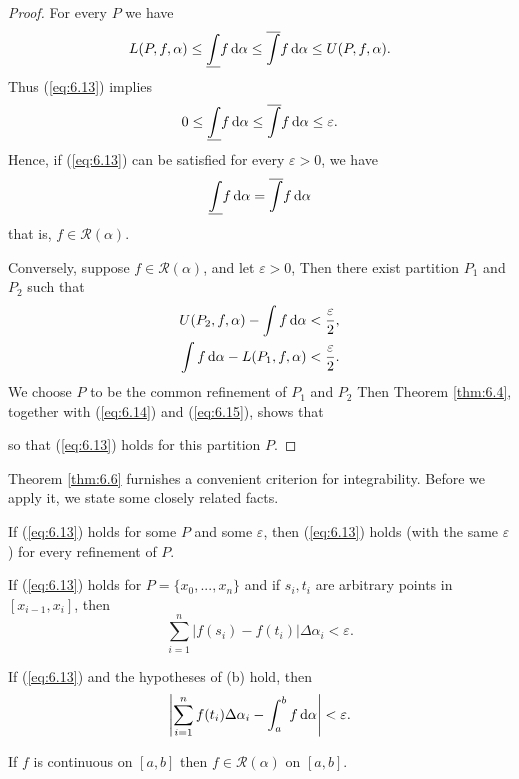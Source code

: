 \begin{proof}
    For every $P$ we have 
    \begin{equation*}
        L(P, f, \alpha)  \leq
        \underline{\int} f \d \alpha \leq
        \overline{\int}  f \d \alpha \leq
        U(P, f, \alpha) .
    \end{equation*}
    Thus (\ref{eq:6.13}) implies 
    \begin{equation*}
        0 \leq
        \underline{\int} f \d \alpha \leq
        \overline{\int}  f \d \alpha \leq
        \varepsilon .
    \end{equation*}
    Hence, if (\ref{eq:6.13}) can be satisfied for every $\varepsilon >0$,
    we have 
    \begin{equation*}
        \underline{\int} f \d \alpha =
        \overline{\int}  f \d \alpha 
    \end{equation*}
    that is, $f \in \mathscr{R}(\alpha)$.

    Conversely, suppose $f \in \mathscr{R}(\alpha)$, and let $\varepsilon > 0$,
    Then there exist partition $P_1$ and $P_2$ such that
    \begin{align}
        \label{eq:6.14}
        U(P_2, f, \alpha) - \int f \d \alpha &< \frac{\varepsilon}{2}, \\
        \label{eq:6.15}
        \int f \d \alpha - L(P_1, f, \alpha) &< \frac{\varepsilon}{2}.
    \end{align}
    We choose $P$ to be the common refinement of $P_1$ and $P_2$ 
    Then Theorem \ref{thm:6.4}, together with (\ref{eq:6.14}) and (\ref{eq:6.15}),
    shows that

    so that (\ref{eq:6.13}) holds for this partition $P$.
\end{proof}

Theorem \ref{thm:6.6} furnishes a convenient criterion for integrability. 
Before we apply it, we state some closely related facts.

\begin{thm}
    \label{thm:6.7}
    \begin{asparaenum}[(a)]
        \item If (\ref{eq:6.13}) holds for some $P$ and some $\varepsilon$,
        then (\ref{eq:6.13}) holds (with the same $\varepsilon$) 
        for every refinement of $P$.
        \item If (\ref{eq:6.13}) holds for $P = \{x_0, ...,x_n\}$ and 
        if $s_i, t_i$ are arbitrary points in $[x_{i-1}, x_i]$, then 
        \begin{equation*}
            \sum_{i=1}^{n} \left| f(s_i) - f(t_i) \right| \Delta \alpha_i < \varepsilon.
        \end{equation*}
        \item If (\ref{eq:6.13}) and the hypotheses of (b) hold, then 
        \begin{equation*}
            \left| \sum_{i=1}^{n}f(t_i)\Delta \alpha_i - \int_{a}^{b} f \d \alpha \right| 
            < \varepsilon.
        \end{equation*}
    \end{asparaenum}
\end{thm}

\begin{thm}
    \label{thm:6.8}
    If $f$ is continuous on $[a, b]$ then $f \in \mathscr{R}(\alpha)$ on $[a, b]$.
\end{thm}
